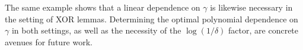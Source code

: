 The same example shows that a linear dependence on $\gamma$ is likewise necessary in the setting of XOR lemmas.  Determining the optimal polynomial dependence on $\gamma$ in both settings, as well as the necessity of the $\log(1/\delta)$ factor, are concrete avenues for future work. 








